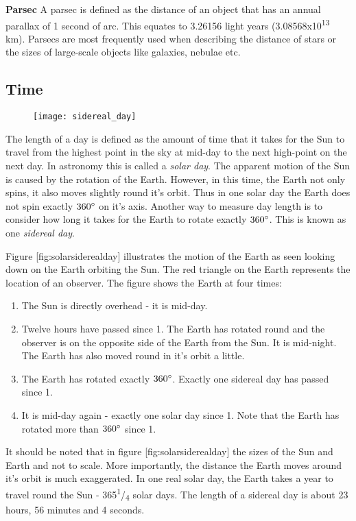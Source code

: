 \textbf{Parsec} A parsec is defined as the distance of an object that
has an annual parallax of 1 second of arc. This equates to 3.26156 light
years (3.08568x10\textsuperscript{13} km). Parsecs are most frequently
used when describing the distance of stars or the sizes of large-scale
objects like galaxies, nebulae etc.

\subsection{Time}\label{time}

\begin{figure}[h]
\centering\texttt{[image: sidereal\_day]}
\end{figure}

The length of a day is defined as the amount of time that it takes for
the Sun to travel from the highest point in the sky at mid-day to the
next high-point on the next day. In astronomy this is called a
\emph{solar day}. The apparent motion of the Sun is caused by the
rotation of the Earth. However, in this time, the Earth not only spins,
it also moves slightly round it's orbit. Thus in one solar day the Earth
does not spin exactly $360\degree$ on it's axis. Another way to measure day
length is to consider how long it takes for the Earth to rotate exactly
$360\degree$. This is known as one \emph{sidereal day}.

Figure {[}fig:solarsiderealday{]} illustrates the motion of the Earth as
seen looking down on the Earth orbiting the Sun. The red triangle on the
Earth represents the location of an observer. The figure shows the Earth
at four times:

\begin{enumerate}
\item
  The Sun is directly overhead - it is mid-day.
\item
  Twelve hours have passed since 1. The Earth has rotated round and the
  observer is on the opposite side of the Earth from the Sun. It is
  mid-night. The Earth has also moved round in it's orbit a little.
\item
  The Earth has rotated exactly $360\degree$. Exactly one sidereal day has
  passed since 1.
\item
  It is mid-day again - exactly one solar day since 1. Note that the
  Earth has rotated more than $360\degree$ since 1.
\end{enumerate}

It should be noted that in figure {[}fig:solarsiderealday{]} the sizes
of the Sun and Earth and not to scale. More importantly, the distance
the Earth moves around it's orbit is much exaggerated. In one real solar
day, the Earth takes a year to travel round the Sun -
365\textsuperscript{1}/\textsubscript{4} solar days. The length of a
sidereal day is about 23 hours, 56 minutes and 4 seconds.


